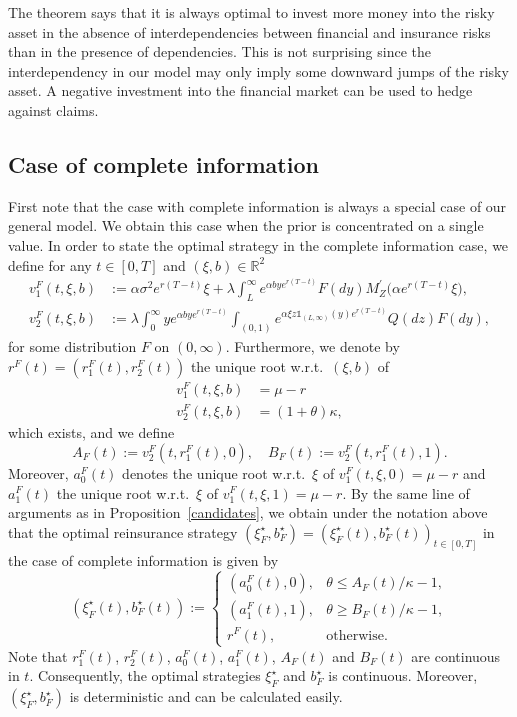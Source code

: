 \documentclass[reqno, 11pt]{amsart}%
\newcommand{\R}{\mathbb{R}}
\theoremstyle{definition}
\numberwithin{equation}{section} \numberwithin{theorem}{section}
\begin{document}
The theorem says that it is always optimal to invest more money into the risky asset in the absence of interdependencies between financial and insurance risks than in the presence of dependencies. This is not surprising since the interdependency in our model may only imply some downward jumps of the risky asset. A negative investment into the financial market can  be used to hedge against claims.


\subsection{Case of complete information}

First note that the case with complete information is always a special case of our general model. We obtain this case when the prior is concentrated on a single value.
In order to state the optimal strategy in the complete information case, we define for any $t\in[0,T]$ and $(\xi,b)\in\R^2$
\begin{align*}
v_1^F(t,\xi,b) &:= \alpha\sigma^2e^{r(T-t)}\xi + \lambda \int_L^\infty e^{\alpha b y e^{r(T-t)}}F(dy)M_Z^\prime\big(\alpha e^{r(T-t)}\xi\big),\\
v_2^F(t,\xi,b) &:= \lambda \int_0^\infty y e^{\alpha b y e^{r(T-t)}}\int_{(0,1)}e^{\alpha\xi z \mathds{1}_{(L,\infty)}(y)e^{r(T-t)}}Q(dz)F(dy),
\end{align*}
for some distribution $F$ on $(0,\infty)$.
Furthermore, we denote by $r^F(t)=(r^F_1(t),r^F_2(t))$ the unique root w.r.t.\ $(\xi,b)$ of
\begin{equation}\label{full:foc}
\begin{aligned}
v_1^F(t,\xi,b) &= \mu-r\\
v_2^F(t,\xi,b) &= (1+\theta)\kappa,
\end{aligned}
\end{equation}
which exists, and we define
\begin{equation*}
A_F(t) := v_2^F(t,r^F_1(t),0), \quad B_F(t) := v_2^F(t,r^F_1(t),1).
\end{equation*}
Moreover, $a_0^F(t)$ denotes the unique root w.r.t.\ $\xi$ of $v_1^F(t,\xi,0)=\mu-r$ and $a_1^F(t)$ the unique root w.r.t.\ $\xi$ of $v_1^F(t,\xi,1)=\mu-r$.
By the same line of arguments as in Proposition~\ref{candidates}, we obtain under the notation above that the optimal reinsurance strategy $(\xi_F^\star,b^\star_{F})=(\xi_F^\star(t),b^\star_{F}(t))_{t\in[0,T]}$ in the case of complete information is given by
\begin{equation}\label{full:xibstart}
(\xi_F^\star(t),b^\star_F(t)) := 
\begin{cases} (a_0^F(t),0), & \theta\le A_F(t)/\kappa -1, \\
(a_1^F(t),1), &\theta \ge B_F(t)/\kappa-1, \\ 
r^F(t), &\text{otherwise}.
\end{cases}
\end{equation}
Note that $r_1^F(t)$, $r_2^F(t)$, $a_0^F(t)$, $a_1^F(t)$, $A_F(t)$ and $B_F(t)$ are continuous in $t$. Consequently, the optimal strategies $\xi^\star_F$ and  $b^\star_F$ is continuous. Moreover, $(\xi^\star_F,b^\star_F)$ is deterministic and can be calculated easily.
\end{document}
